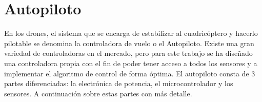 \section{Autopiloto}

En los drones, el sistema que se encarga de estabilizar al cuadricóptero y hacerlo pilotable se denomina la controladora de vuelo o el Autopiloto. Existe una gran variedad de controladoras en el mercado, pero para este trabajo se ha diseñado una controladora propia con el fin de poder tener acceso a todos los sensores y a implementar el algoritmo de control de forma óptima. El autopiloto consta de 3 partes diferenciadas: la electrónica de potencia, el microcontrolador y los sensores. A continuación  sobre estas partes con más detalle.\\



